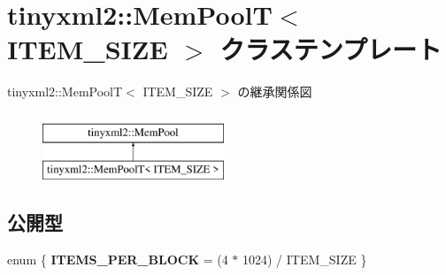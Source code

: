 \hypertarget{classtinyxml2_1_1_mem_pool_t}{}\section{tinyxml2\+:\+:Mem\+PoolT$<$ I\+T\+E\+M\+\_\+\+S\+I\+ZE $>$ クラステンプレート}
\label{classtinyxml2_1_1_mem_pool_t}
tinyxml2\+:\+:Mem\+PoolT$<$ I\+T\+E\+M\+\_\+\+S\+I\+ZE $>$ の継承関係図\begin{figure}[H]
\begin{center}
\leavevmode
\includegraphics[height=2.000000cm]{classtinyxml2_1_1_mem_pool_t}
\end{center}
\end{figure}
\subsection*{公開型}
\begin{DoxyCompactItemize}
\item 
\mbox{\label{classtinyxml2_1_1_mem_pool_t_a04cf45156e6f913f93972869ff8a1d94}} 
enum \{ {\bfseries I\+T\+E\+M\+S\+\_\+\+P\+E\+R\+\_\+\+B\+L\+O\+CK} = (4 $\ast$ 1024) / I\+T\+E\+M\+\_\+\+S\+I\+ZE
 \}
\end{DoxyCompactItemize}
